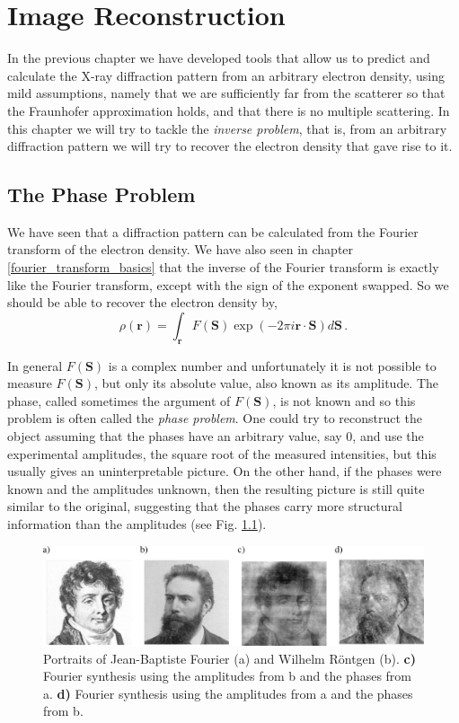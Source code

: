 \chapter{Image Reconstruction}\label{Image Reconstruction}\noindent

In the previous chapter we have developed tools that allow us to predict
and calculate the X-ray diffraction pattern from an arbitrary electron density,
using mild assumptions, namely that we are sufficiently far from the scatterer so
that the Fraunhofer approximation holds, and that there is no multiple
scattering.
In this chapter we will try to tackle the {\em inverse
  problem}, that is, from an arbitrary diffraction pattern we will try to
recover the electron density that gave rise to it.
\section{The Phase Problem}

We have seen that a diffraction pattern can be calculated from the Fourier
transform of the electron density. We have also seen in chapter
\ref{fourier_transform_basics} that the inverse of the Fourier transform is
exactly like the Fourier transform, except with the sign of the exponent
swapped. So we should be able to recover the electron density by,
\begin{equation}
\rho(\mathbf r) = \int_{\mathbf r} F(\mathbf S) \exp\left(-2
    \pi i \mathbf r \cdot \mathbf S \right) d\mathbf S\, .
\end{equation}

In general $F(\mathbf S)$ is a complex number and unfortunately it is not
possible to measure $F(\mathbf S)$, but only its absolute value, also known as its
amplitude. The phase, called sometimes the argument of $F(\mathbf S)$, is not known and so
this problem is often called the {\em phase problem}. One could try to reconstruct the
object assuming that the phases have an arbitrary value, say 0, and use the
experimental amplitudes, the square root of the measured intensities, but this usually gives an uninterpretable picture. On
the other hand, if the phases were known and the amplitudes unknown, then the
resulting picture is still quite similar to the original, suggesting that the
phases carry more structural information than the amplitudes (see Fig. \ref{Fig:PhaseSwapping}).
\begin{figure}[h]
  \centering
  \includegraphics[width=1 \columnwidth]{Image_Reconstruction/PhaseSwapping2.png}
  \caption{Portraits of Jean-Baptiste Fourier (a) and Wilhelm R\"{o}ntgen (b).
    {\bf c)} Fourier synthesis using the amplitudes from b and the phases from
    a. {\bf d)}
    Fourier synthesis using the amplitudes from a and the phases from b.}
  \label{Fig:PhaseSwapping}
\end{figure}

